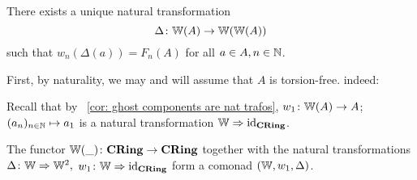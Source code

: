 \begin{proposition} \label{prop: existence of diagonal}
    There exists a unique natural transformation
    \[
      \Delta \colon \mathbb{W}(A) \to \mathbb{W}(\mathbb{W}(A))  
    \]
    such that $w_n(\Delta(a))=F_n(A)$ for all $a \in A, n \in \mathbb{N}$.
\end{proposition}
\begin{beweis}
First, by naturality, we may and will assume that $A$ is torsion-free.
indeed: 
\end{beweis}
Recall that by ~\ref{cor: ghost components are nat trafos},
$w_1 \colon \mathbb{W}(A) \to A$; $(a_n)_{n \in \mathbb{N}} \mapsto a_1$
is a natural transformation $\mathbb{W} \Rightarrow \operatorname{id}_{\mathbf{CRing}}$.
\begin{theorem} \label{thm: comonad structure}
    The functor $\mathbb{W}(\_) \colon \mathbf{CRing} \to \mathbf{CRing}$ together with the
    natural transformations $\Delta \colon \mathbb{W} \Rightarrow \mathbb{W}^2,$ $w_1 \colon 
    \mathbb{W} \Rightarrow \operatorname{id}_{\mathbf{CRing}}$ form a comonad $(\mathbb{W},w_1,\Delta)$.
\end{theorem}

